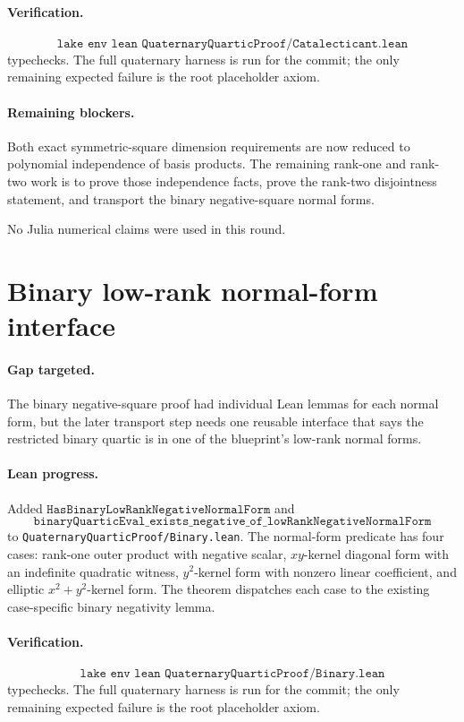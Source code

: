 \documentclass[11pt]{article}
\begin{document}
\paragraph{Verification.}
\[
\texttt{lake env lean QuaternaryQuarticProof/Catalecticant.lean}
\]
typechecks.  The full quaternary harness is run for the commit; the only
remaining expected failure is the root placeholder axiom.

\paragraph{Remaining blockers.}
Both exact symmetric-square dimension requirements are now reduced to
polynomial independence of basis products.  The remaining rank-one and
rank-two work is to prove those independence facts, prove the rank-two
disjointness statement, and transport the binary negative-square normal forms.

No Julia numerical claims were used in this round.

\section*{Binary low-rank normal-form interface}

\paragraph{Gap targeted.}
The binary negative-square proof had individual Lean lemmas for each normal
form, but the later transport step needs one reusable interface that says the
restricted binary quartic is in one of the blueprint's low-rank normal forms.

\paragraph{Lean progress.}
Added \(\texttt{HasBinaryLowRankNegativeNormalForm}\) and
\[
\texttt{binaryQuarticEval\_exists\_negative\_of\_lowRankNegativeNormalForm}
\]
to \texttt{QuaternaryQuarticProof/Binary.lean}.  The normal-form predicate has
four cases: rank-one outer product with negative scalar, \(xy\)-kernel
diagonal form with an indefinite quadratic witness, \(y^2\)-kernel form with
nonzero linear coefficient, and elliptic \(x^2+y^2\)-kernel form.  The theorem
dispatches each case to the existing case-specific binary negativity lemma.

\paragraph{Verification.}
\[
\texttt{lake env lean QuaternaryQuarticProof/Binary.lean}
\]
typechecks.  The full quaternary harness is run for the commit; the only
remaining expected failure is the root placeholder axiom.
\end{document}
